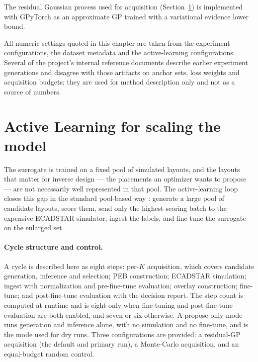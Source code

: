 The residual Gaussian process used for acquisition (Section~\ref{sec:active_learning}) is implemented
with GPyTorch \cite{gardner2018gpytorch} as an approximate GP trained with a variational evidence
lower bound.

All numeric settings quoted in this chapter are taken from the experiment configurations, the dataset
metadata and the active-learning configurations. Several of the project's internal reference
documents describe earlier experiment generations and disagree with those artifacts on anchor sets,
loss weights and acquisition budgets; they are used for method description only and not as a source
of numbers.

\section{Active Learning for scaling the model}
\label{sec:active_learning}

The surrogate is trained on a fixed pool of simulated layouts, and the layouts that matter for
inverse design --- the placements an optimizer wants to propose --- are not necessarily well
represented in that pool. The active-learning loop closes this gap in the standard pool-based way
\cite{settles2009active, batchal2022batch}: generate a large pool of candidate layouts, score them,
send only the highest-scoring batch to the expensive ECADSTAR simulator, ingest the labels, and
fine-tune the surrogate on the enlarged set.

\paragraph{Cycle structure and control.} A cycle is described here as eight steps: per-$K$
acquisition, which covers candidate generation, inference and selection; PEB construction; ECADSTAR
simulation; ingest with normalization and pre-fine-tune evaluation; overlay construction; fine-tune;
and post-fine-tune evaluation with the decision report. The step count is computed at runtime and is
eight only when fine-tuning and post-fine-tune evaluation are both enabled, and seven or six
otherwise. A propose-only mode runs generation and inference alone, with no simulation and no
fine-tune, and is the mode used for dry runs. Three configurations are provided: a residual-GP
acquisition (the default and primary run), a Monte-Carlo acquisition, and an equal-budget random
control.

